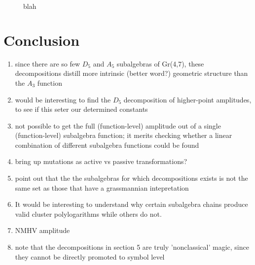 \documentclass[11pt]{article}
\begin{document}
\begin{figure}[t]   \centering
  \caption{blah}
\label{fig:R27_decompositions}
\end{figure}




\section{Conclusion}

\begin{enumerate}
\item since there are so few $D_5$ and $A_5$ subalgebras of Gr(4,7), these decompositions distill more intrinsic (better word?) geometric structure than the $A_3$ function 
\item would be interesting to find the $D_5$ decomposition of higher-point amplitudes, to see if this seter our determined constants
\item not possible to get the full (function-level) amplitude out of a single (function-level) subalgebra function; it merits checking whether a linear combination of different subalgebra functions could be found
\item bring up mutations as active vs passive transformations?
\item point out that the the subalgebras for which decompositions exists is not the same set as those that have a grassmannian intepretation
\item It would be interesting to understand why certain subalgebra chains produce valid cluster polylogarithms while others do not. 
\item NMHV amplitude 
\item note that the decompositions in section 5 are truly 'nonclassical' magic, since they cannot be directly promoted to symbol level
\end{enumerate}
\end{document}
